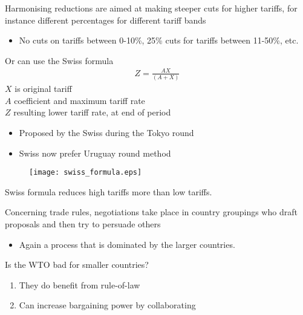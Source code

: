 \documentclass{beamer}
\begin{document}
\begin{frame}
Harmonising reductions are aimed at making steeper cuts for higher tariffs, for instance different percentages for different tariff bands
\begin{itemize}
  \item No cuts on tariffs between 0-10\%, 25\% cuts for tariffs between 11-50\%, etc.  
\end{itemize}
\medskip
Or can use the Swiss formula
 \begin{align*}
   Z=\frac{AX}{(A+X)}
 \end{align*}
 $X$ is original tariff\\
 $A$ coefficient and maximum tariff rate\\
 $Z$ resulting lower tariff rate, at end of period\\
 \begin{itemize}
   \item Proposed by the Swiss during the Tokyo round
   \item Swiss now prefer Uruguay round method
 \end{itemize}
\end{frame}

\begin{frame}
  \begin{figure}
    \texttt{[image: swiss\_formula.eps]}
  \end{figure}
  Swiss formula reduces high tariffs more than low tariffs. 
\end{frame}

\begin{frame}
  Concerning trade rules, negotiations take place in country groupings who draft proposals and then try to persuade others
  \begin{itemize}
    \item Again a process that is dominated by the larger countries.
  \end{itemize}
  \medskip
  Is the WTO bad for smaller countries?
  \begin{enumerate}
    \item They do benefit from rule-of-law
    \item Can increase bargaining power by collaborating
  \end{enumerate}
\end{frame}
\end{document}
